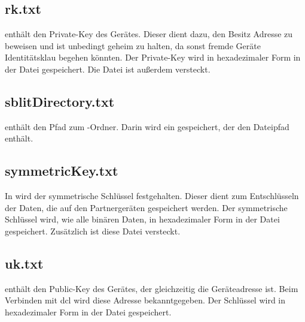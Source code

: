 \subsection{rk.txt} \label{rktxt}
 enthält den Private-Key des Gerätes. Dieser dient dazu, den Besitz Adresse zu beweisen und ist unbedingt geheim zu halten, da sonst fremde Geräte Identitätsklau begehen könnten. Der Private-Key wird in hexadezimaler Form in der Datei gespeichert. Die Datei ist außerdem versteckt.

\subsection{sblitDirectory.txt} \label{sblitDirectorytxt}
 enthält den Pfad zum \sblit-Ordner. Darin wird ein  gespeichert, der den Dateipfad enthält. 

\subsection{symmetricKey.txt} \label{symmetricKeytxt}
In  wird der symmetrische Schlüssel  festgehalten. Dieser dient zum Entschlüsseln der Daten, die auf den Partnergeräten gespeichert werden. Der symmetrische Schlüssel wird, wie alle binären Daten, in hexadezimaler Form in der Datei gespeichert. Zusätzlich ist diese Datei versteckt.

\subsection{uk.txt} \label{uktxt}
 enthält den Public-Key des Gerätes, der gleichzeitig die Geräteadresse ist. Beim Verbinden mit \gls{dcl} wird diese Adresse bekanntgegeben. Der Schlüssel wird in hexadezimaler Form in der Datei gespeichert.
